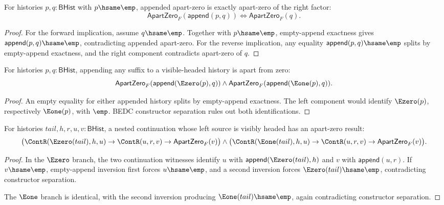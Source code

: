 \begin{theorem}
\label{thm:field-apartzero-append-left-empty-iff}
For histories $p,q:\mathsf{BHist}$ with $p\hsame\emp$, appended apart-zero
is exactly apart-zero of the right factor:
$$
\mathsf{ApartZero}_F(\mathsf{append}(p,q))
\Longleftrightarrow
\mathsf{ApartZero}_F(q).
$$
\end{theorem}
\begin{proof}
For the forward implication, assume $q\hsame\emp$. Together with
$p\hsame\emp$, empty-append exactness gives
$\mathsf{append}(p,q)\hsame\emp$, contradicting appended apart-zero. For the
reverse implication, any equality
$\mathsf{append}(p,q)\hsame\emp$ splits by empty-append exactness, and the
right component contradicts apart-zero of $q$.
\end{proof}

\begin{theorem}
\label{thm:field-apartzero-append-visible-headed}
For histories $p,q:\mathsf{BHist}$, appending any suffix to a visible-headed
history is apart from zero:
$$
\mathsf{ApartZero}_F(\mathsf{append}(\Ezero(p),q))
\land
\mathsf{ApartZero}_F(\mathsf{append}(\Eone(p),q)).
$$
\end{theorem}
\begin{proof}
An empty equality for either appended history splits by empty-append
exactness. The left component would identify $\Ezero(p)$, respectively
$\Eone(p)$, with $\emp$. BEDC constructor separation rules out both
identifications.
\end{proof}

\begin{theorem}
\label{thm:field-apartzero-nested-continuation-visible-left-result}
For histories $tail,h,r,u,v:\mathsf{BHist}$, a nested continuation whose
left source is visibly headed has an apart-zero result:
$$
\bigl(\ContR(\Ezero(tail),h,u)\to\ContR(u,r,v)\to
\mathsf{ApartZero}_F(v)\bigr)
\land
\bigl(\ContR(\Eone(tail),h,u)\to\ContR(u,r,v)\to
\mathsf{ApartZero}_F(v)\bigr).
$$
\end{theorem}
\begin{proof}
In the $\Ezero$ branch, the two continuation witnesses identify $u$ with
$\mathsf{append}(\Ezero(tail),h)$ and $v$ with
$\mathsf{append}(u,r)$. If $v\hsame\emp$, empty-append inversion first forces
$u\hsame\emp$, and a second inversion forces $\Ezero(tail)\hsame\emp$,
contradicting constructor separation.

The $\Eone$ branch is identical, with the second inversion producing
$\Eone(tail)\hsame\emp$, again contradicting constructor separation.
\end{proof}

